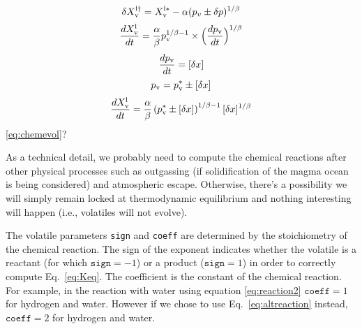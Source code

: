\begin{equation}  
    \delta X_{\rm v}^{\rm l\dagger}  = X_{\rm v}^{\rm l \ast} - \alpha(p_v\pm\delta p)^{1/\beta} 
\end{equation}
\begin{equation}
    \frac{d  X_{\rm v}^{\rm l}}{dt} = \frac{\alpha}{\beta}p_{\rm v}^{1/\beta -1} \times \Big(\frac{dp_{\rm v}}{dt} \Big)^{1/\beta }
\end{equation}
\begin{equation}
    \frac{dp_{\rm v}}{dt} = [\delta x]
\end{equation}
\begin{equation}
    p_{\rm v}=p_{\rm v}^\ast \pm [\delta x]
\end{equation}
\begin{equation}
     \frac{d  X_{\rm v}^{\rm l}}{dt} = \frac{\alpha}{\beta}\left( p_{\rm v}^\ast \pm [\delta x] \right)^{1/\beta -1} [\delta x]^{1/\beta}
\end{equation}
 \ref{eq:chemevol}? 

As a technical detail, we probably need to compute the chemical reactions after other physical processes such as outgassing (if solidification of the magma ocean is being considered) and atmospheric escape.  Otherwise, there's a possibility we will simply remain locked at thermodynamic equilibrium and nothing interesting will happen (i.e., volatiles will not evolve).   

The volatile parameters \texttt{sign} and \texttt{coeff} are determined by the stoichiometry of the chemical reaction. The sign of the exponent indicates whether the volatile is a reactant (for which $\texttt{sign}=-1$) or a product ($\texttt{sign}=1$) in order to correctly compute Eq.~\ref{eq:Keq}. The coefficient is the constant of the chemical reaction. For example, in the reaction with water using equation \ref{eq:reaction2} $\texttt{coeff}=1$ for hydrogen and water. However if we chose to use Eq.~\ref{eq:altreaction} instead, $\texttt{coeff}=2$ for hydrogen and water. 

